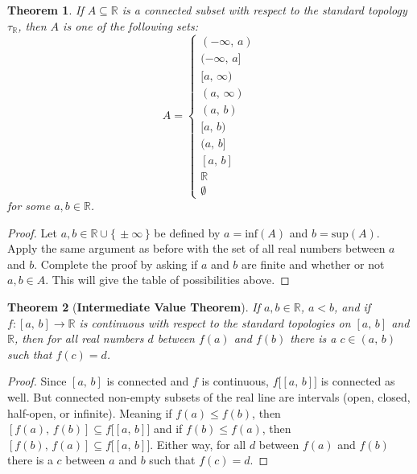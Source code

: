 \documentclass{article}
\theoremstyle{plain}
\newtheorem{theorem}{Theorem}[section]
\theoremstyle{normal}
\begin{document}
         \begin{theorem}
            If $A\subseteq\mathbb{R}$ is a connected subset with respect to the
            standard topology $\tau_{\mathbb{R}}$, then $A$ is one of the
            following sets:
            \begin{equation}
                A=
                \begin{cases}
                    (-\infty,\,a)\\
                    (-\infty,\,a]\\
                    [a,\,\infty)\\
                    (a,\,\infty)\\
                    (a,\,b)\\
                    [a,\,b)\\
                    (a,\,b]\\
                    [a,\,b]\\
                    \mathbb{R}\\
                    \emptyset
                \end{cases}
            \end{equation}
            for some $a,b\in\mathbb{R}$.
         \end{theorem}
         \begin{proof}
            Let $a,b\in\mathbb{R}\cup\{\,\pm\infty\,\}$ be defined by
            $a=\textrm{inf}(A)$ and $b=\textrm{sup}(A)$. Apply the same
            argument as before with the set of all real numbers between $a$ and
            $b$. Complete the proof by asking if $a$ and $b$ are finite and
            whether or not $a,b\in{A}$. This will give the table of
            possibilities above.
         \end{proof}
         \begin{theorem}[\textbf{Intermediate Value Theorem}]
            If $a,b\in\mathbb{R}$, $a<b$, and if
            $f:[a,\,b]\rightarrow\mathbb{R}$ is continuous with respect to the
            standard topologies on $[a,\,b]$ and $\mathbb{R}$, then for all
            real numbers $d$ between $f(a)$ and $f(b)$ there is a $c\in(a,\,b)$
            such that $f(c)=d$.
         \end{theorem}
         \begin{proof}
            Since $[a,\,b]$ is connected and $f$ is continuous,
            $f\big[[a,\,b]\big]$ is connected as well. But connected
            non-empty subsets of the real line are intervals
            (open, closed, half-open, or infinite). Meaning if
            $f(a)\leq{f}(b)$, then $[f(a),\,f(b)]\subseteq{f}\big[[a,\,b]\big]$
            and if $f(b)\leq{f}(a)$, then
            $[f(b),\,f(a)]\subseteq{f}\big[[a,\,b]\big]$. Either way, for
            all $d$ between $f(a)$ and $f(b)$ there is a $c$ between $a$ and $b$
            such that $f(c)=d$.
         \end{proof}
\end{document}
